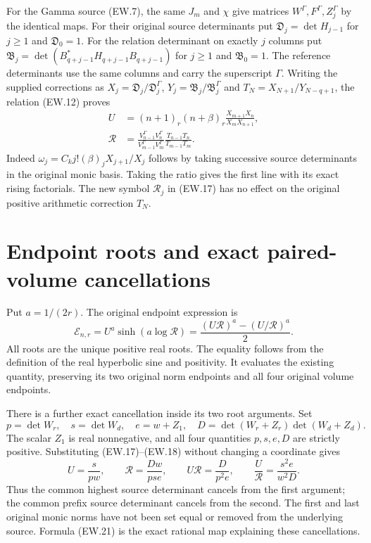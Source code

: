 \documentclass[11pt]{article}
\begin{document}
For the Gamma source (EW.7), the same $J_m$ and $\chi$ give
matrices $W^\Gamma,F^\Gamma,Z_j^\Gamma$ by the identical maps.
For their original source determinants put
$\mathfrak D_j=\det H_{j-1}$ for $j\ge1$ and
$\mathfrak D_0=1$. For the relation determinant on exactly $j$
columns put
$\mathfrak B_j=\det(B_{q+j-1}^*H_{q+j-1}B_{q+j-1})$ for
$j\ge1$ and $\mathfrak B_0=1$. The reference determinants use
the same columns and carry the superscript $\Gamma$.
Writing the supplied corrections as
$X_j=\mathfrak D_j/\mathfrak D_j^\Gamma$,
$Y_j=\mathfrak B_j/\mathfrak B_j^\Gamma$ and
$T_N=X_{N+1}/Y_{N-q+1}$, the relation (EW.12) proves
\[
 \begin{split}
 U&=(n+1)_r(n+\beta)_r
       \frac{X_{m+1}X_n}{X_mX_{n+1}},\\
 \mathscr R&=\frac{V_{n-1}^\Gamma V_n^\Gamma}
                    {V_{m-1}^\Gamma V_m^\Gamma}
             \frac{T_{n-1}T_n}{T_{m-1}T_m}.
 \end{split}                                                   \tag{EW.19}
\]
Indeed $\omega_j=C_kj!(\beta)_jX_{j+1}/X_j$ follows by
taking successive source determinants in the original monic basis.
Taking the ratio gives the first line with its exact rising factorials.
The new symbol $\mathscr R_j$ in (EW.17) has no effect on the
original positive arithmetic correction $T_N$.

\section{Endpoint roots and exact paired-volume cancellations}

Put $a=1/(2r)$. The original endpoint expression is
\[
 \mathcal E_{n,r}=U^a\sinh(a\log\mathscr R)
   =\frac{(U\mathscr R)^a-(U/\mathscr R)^a}{2}.              \tag{EW.20}
\]
All roots are the unique positive real roots. The equality follows
from the definition of the real hyperbolic sine and positivity.
It evaluates the existing quantity, preserving its two original norm
endpoints and all four original volume endpoints.

There is a further exact cancellation inside its two root arguments.
Set
\[
 p=\det W_r,\quad s=\det W_d,\quad
 e=w+Z_1,\quad
 D=\det(W_r+Z_r)\det(W_d+Z_d).
\]
The scalar $Z_1$ is real nonnegative, and all four quantities
$p,s,e,D$ are strictly positive. Substituting (EW.17)--(EW.18)
without changing a coordinate gives
\[
 U=\frac{s}{pw},\qquad\mathscr R=\frac{Dw}{pse},\qquad
 \boxed{U\mathscr R=\frac{D}{p^2e},\qquad
        \frac U{\mathscr R}=\frac{s^2e}{w^2D}.}              \tag{EW.21}
\]
Thus the common highest source determinant cancels from the first
argument; the common prefix source determinant cancels from the
second. The first and last original monic norms have not been set
equal or removed from the underlying source. Formula (EW.21) is the
exact rational map explaining these cancellations.
\end{document}
